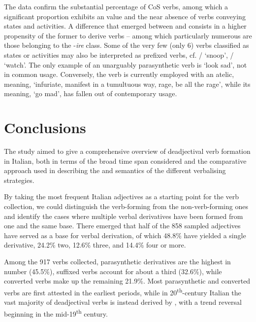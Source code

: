 \documentclass[output=paper,colorlinks,citecolor=brown]{langscibook}
\begin{document}
The data confirm the substantial percentage of CoS  verbs, among which a significant proportion exhibits an  value and the near absence of verbs conveying states and activities. A difference that emerged between  and  consists in a higher propensity of the former to derive  verbs -- among which particularly numerous are those belonging to the -\textit{ire} class. Some of the very few (only 6) verbs classified as states or activities may also be interpreted as prefixed verbs, cf. / ‘snoop’, / ‘watch’. The only example of an unarguably parasynthetic verb is  ‘look sad’, not in common usage. Conversely, the verb  is currently employed with an atelic,  meaning, ‘infuriate, manifest in a tumultuous way, rage, be all the rage’, while its  meaning, ‘go mad’, has fallen out of contemporary usage.

\section{Conclusions}
\label{sec:conclusion}

The study aimed to give a comprehensive overview of deadjectival verb formation in Italian, both in terms of the broad time span considered and the comparative approach used in describing the  and semantics of the different verbalising strategies.

By taking the most frequent Italian adjectives as a starting point for the verb collection, we could distinguish the verb-forming from the non-verb-forming ones and identify the cases where multiple verbal derivatives have been formed from one and the same base. There emerged that half of the 858 sampled adjectives have served as a base for verbal derivation, of which 48.8\% have yielded a single derivative, 24.2\% two, 12.6\% three, and 14.4\% four or more.

Among the 917 verbs collected, parasynthetic derivatives are the highest in number (45.5\%), suffixed verbs account for about a third (32.6\%), while converted verbs make up the remaining 21.9\%. Most parasynthetic and converted verbs  are first attested in the earliest periods, while in 20\textsuperscript{th}-century Italian the vast majority of deadjectival verbs is instead derived by , with a trend reversal beginning in the mid-19\textsuperscript{th} century.
\end{document}
